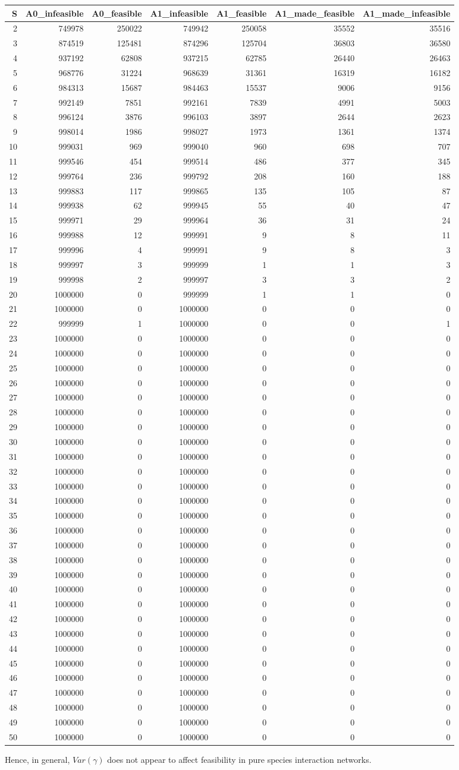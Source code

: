 \documentclass[]{article}
\begin{document}
\begin{longtable}[]{@{}rrrrrrr@{}}
\toprule
S & A0\_infeasible & A0\_feasible & A1\_infeasible & A1\_feasible &
A1\_made\_feasible & A1\_made\_infeasible\tabularnewline
\midrule
\endhead
2 & 749978 & 250022 & 749942 & 250058 & 35552 & 35516\tabularnewline
3 & 874519 & 125481 & 874296 & 125704 & 36803 & 36580\tabularnewline
4 & 937192 & 62808 & 937215 & 62785 & 26440 & 26463\tabularnewline
5 & 968776 & 31224 & 968639 & 31361 & 16319 & 16182\tabularnewline
6 & 984313 & 15687 & 984463 & 15537 & 9006 & 9156\tabularnewline
7 & 992149 & 7851 & 992161 & 7839 & 4991 & 5003\tabularnewline
8 & 996124 & 3876 & 996103 & 3897 & 2644 & 2623\tabularnewline
9 & 998014 & 1986 & 998027 & 1973 & 1361 & 1374\tabularnewline
10 & 999031 & 969 & 999040 & 960 & 698 & 707\tabularnewline
11 & 999546 & 454 & 999514 & 486 & 377 & 345\tabularnewline
12 & 999764 & 236 & 999792 & 208 & 160 & 188\tabularnewline
13 & 999883 & 117 & 999865 & 135 & 105 & 87\tabularnewline
14 & 999938 & 62 & 999945 & 55 & 40 & 47\tabularnewline
15 & 999971 & 29 & 999964 & 36 & 31 & 24\tabularnewline
16 & 999988 & 12 & 999991 & 9 & 8 & 11\tabularnewline
17 & 999996 & 4 & 999991 & 9 & 8 & 3\tabularnewline
18 & 999997 & 3 & 999999 & 1 & 1 & 3\tabularnewline
19 & 999998 & 2 & 999997 & 3 & 3 & 2\tabularnewline
20 & 1000000 & 0 & 999999 & 1 & 1 & 0\tabularnewline
21 & 1000000 & 0 & 1000000 & 0 & 0 & 0\tabularnewline
22 & 999999 & 1 & 1000000 & 0 & 0 & 1\tabularnewline
23 & 1000000 & 0 & 1000000 & 0 & 0 & 0\tabularnewline
24 & 1000000 & 0 & 1000000 & 0 & 0 & 0\tabularnewline
25 & 1000000 & 0 & 1000000 & 0 & 0 & 0\tabularnewline
26 & 1000000 & 0 & 1000000 & 0 & 0 & 0\tabularnewline
27 & 1000000 & 0 & 1000000 & 0 & 0 & 0\tabularnewline
28 & 1000000 & 0 & 1000000 & 0 & 0 & 0\tabularnewline
29 & 1000000 & 0 & 1000000 & 0 & 0 & 0\tabularnewline
30 & 1000000 & 0 & 1000000 & 0 & 0 & 0\tabularnewline
31 & 1000000 & 0 & 1000000 & 0 & 0 & 0\tabularnewline
32 & 1000000 & 0 & 1000000 & 0 & 0 & 0\tabularnewline
33 & 1000000 & 0 & 1000000 & 0 & 0 & 0\tabularnewline
34 & 1000000 & 0 & 1000000 & 0 & 0 & 0\tabularnewline
35 & 1000000 & 0 & 1000000 & 0 & 0 & 0\tabularnewline
36 & 1000000 & 0 & 1000000 & 0 & 0 & 0\tabularnewline
37 & 1000000 & 0 & 1000000 & 0 & 0 & 0\tabularnewline
38 & 1000000 & 0 & 1000000 & 0 & 0 & 0\tabularnewline
39 & 1000000 & 0 & 1000000 & 0 & 0 & 0\tabularnewline
40 & 1000000 & 0 & 1000000 & 0 & 0 & 0\tabularnewline
41 & 1000000 & 0 & 1000000 & 0 & 0 & 0\tabularnewline
42 & 1000000 & 0 & 1000000 & 0 & 0 & 0\tabularnewline
43 & 1000000 & 0 & 1000000 & 0 & 0 & 0\tabularnewline
44 & 1000000 & 0 & 1000000 & 0 & 0 & 0\tabularnewline
45 & 1000000 & 0 & 1000000 & 0 & 0 & 0\tabularnewline
46 & 1000000 & 0 & 1000000 & 0 & 0 & 0\tabularnewline
47 & 1000000 & 0 & 1000000 & 0 & 0 & 0\tabularnewline
48 & 1000000 & 0 & 1000000 & 0 & 0 & 0\tabularnewline
49 & 1000000 & 0 & 1000000 & 0 & 0 & 0\tabularnewline
50 & 1000000 & 0 & 1000000 & 0 & 0 & 0\tabularnewline
\bottomrule
\end{longtable}

Hence, in general, \(Var(\gamma)\) does not appear to affect feasibility
in pure species interaction networks.
\end{document}
